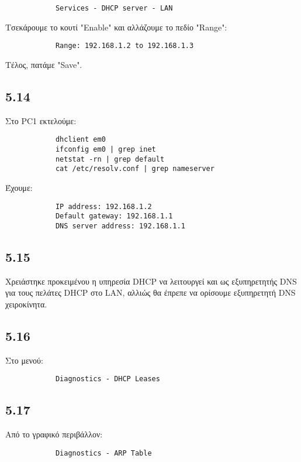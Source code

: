 \documentclass[a4paper, 12pt]{article}
\begin{document}
		\begin{verbatim}
			Services - DHCP server - LAN
		\end{verbatim}
		
		Τσεκάρουμε το κουτί "Enable" και αλλάζουμε το πεδίο "Range":
		
		\begin{verbatim}
			Range: 192.168.1.2 to 192.168.1.3
		\end{verbatim}
		
		Τέλος, πατάμε "Save".

	\subsection*{5.14}
		Στο PC1 εκτελούμε:
		
		\begin{verbatim}
			dhclient em0
			ifconfig em0 | grep inet
			netstat -rn | grep default
			cat /etc/resolv.conf | grep nameserver
		\end{verbatim}
		
		Έχουμε:
		
		\begin{verbatim}
			IP address: 192.168.1.2
			Default gateway: 192.168.1.1
			DNS server address: 192.168.1.1
		\end{verbatim}

	\subsection*{5.15}
		Χρειάστηκε προκειμένου η υπηρεσία DHCP να λειτουργεί και ως εξυπηρετητής DNS για τους πελάτες DHCP στο LAN, αλλιώς θα έπρεπε να ορίσουμε εξυπηρετητή DNS χειροκίνητα.

	\subsection*{5.16}
		Στο μενού:
		
		\begin{verbatim}
			Diagnostics - DHCP Leases
		\end{verbatim}

	\subsection*{5.17}
		Από το γραφικό περιβάλλον:
		
		\begin{verbatim}
			Diagnostics - ARP Table
		\end{verbatim}
		
\end{document}
